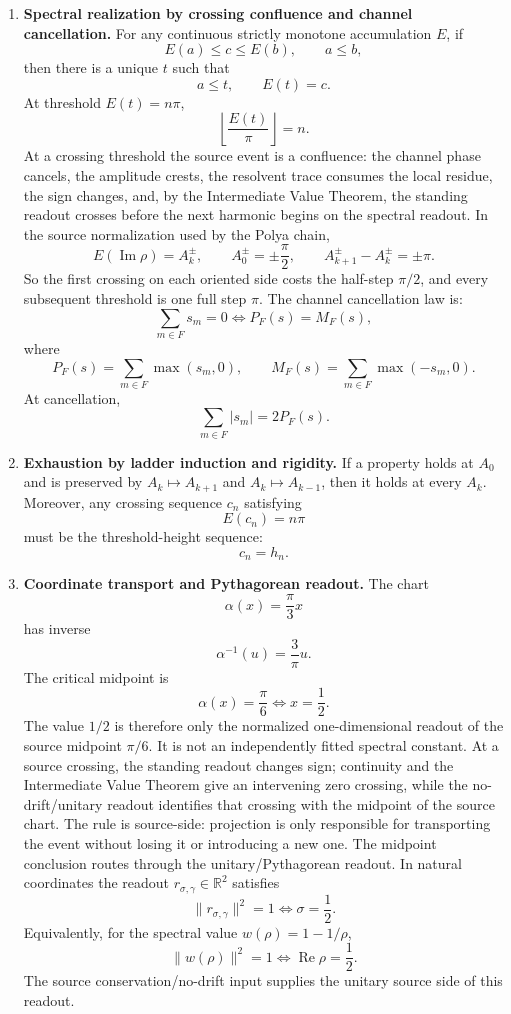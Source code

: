 \documentclass[11pt]{article}
\DeclareMathOperator{\Ree}{Re}
\DeclareMathOperator{\Imm}{Im}
\begin{document}
\begin{enumerate}[label=R\arabic*., leftmargin=2cm]
\item \textbf{Spectral realization by crossing confluence and channel cancellation.}
For any continuous strictly monotone accumulation $E$, if
\[
  E(a)\le c\le E(b),\qquad a\le b,
\]
then there is a unique $t$ such that
\[
  a\le t,\qquad E(t)=c.
\]
At threshold $E(t)=n\pi$,
\[
  \left\lfloor\frac{E(t)}{\pi}\right\rfloor=n.
\]
At a crossing threshold the source event is a confluence: the channel phase
cancels, the amplitude crests, the resolvent trace consumes the
local residue, the sign changes, and, by the Intermediate Value Theorem, the
standing readout crosses before the next harmonic begins on the spectral
readout.  In the source normalization used by the Polya chain,
\[
  E(\Imm\rho)=A_k^\pm,\qquad
  A_0^\pm=\pm\frac{\pi}{2},\qquad
  A_{k+1}^\pm-A_k^\pm=\pm\pi .
\]
So the first crossing on each oriented side costs the half-step $\pi/2$, and
every subsequent threshold is one full step $\pi$.  The channel cancellation law
is:
\[
  \sum_{m\in F} s_m=0
  \Longleftrightarrow
  P_F(s)=M_F(s),
\]
where
\[
  P_F(s)=\sum_{m\in F}\max(s_m,0),\qquad
  M_F(s)=\sum_{m\in F}\max(-s_m,0).
\]
At cancellation,
\[
  \sum_{m\in F}|s_m|=2P_F(s).
\]

\item \textbf{Exhaustion by ladder induction and rigidity.}
If a property holds at $A_0$ and is preserved by $A_k\mapsto A_{k+1}$ and
$A_k\mapsto A_{k-1}$, then it holds at every $A_k$.
Moreover, any crossing sequence $c_n$ satisfying
\[
  E(c_n)=n\pi
\]
must be the threshold-height sequence:
\[
  c_n=h_n.
\]

\item \textbf{Coordinate transport and Pythagorean readout.}
The chart
\[
  \alpha(x)=\frac\pi3x
\]
has inverse
\[
  \alpha^{-1}(u)=\frac3\pi u.
\]
The critical midpoint is
\[
  \alpha(x)=\frac\pi6
  \Longleftrightarrow
  x=\frac12.
\]
The value $1/2$ is therefore only the normalized one-dimensional readout of
the source midpoint $\pi/6$.  It is not an independently fitted spectral
constant.  At a source crossing, the standing readout changes sign; continuity
and the Intermediate Value Theorem give an intervening zero crossing, while the
no-drift/unitary readout identifies that crossing with the midpoint of the
source chart.  The
rule is source-side: projection is only responsible for transporting the event
without losing it or introducing a new one.
The midpoint conclusion routes through the unitary/Pythagorean readout.  In
natural coordinates the readout $r_{\sigma,\gamma}\in\mathbb R^2$ satisfies
\[
  \lVert r_{\sigma,\gamma}\rVert^2=1
  \Longleftrightarrow
  \sigma=\frac12.
\]
Equivalently, for the spectral value $w(\rho)=1-1/\rho$,
\[
  \|w(\rho)\|^2=1
  \Longleftrightarrow
  \Ree\rho=\frac12.
\]
The source conservation/no-drift input supplies the unitary source side of this
readout.


\end{enumerate}
\end{document}
